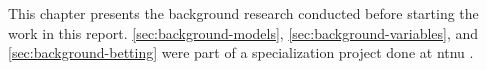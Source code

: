 This chapter presents the background research conducted before starting the work in this report. \cref{sec:background-models}, \cref{sec:background-variables}, and \cref{sec:background-betting} were part of a specialization project done at \gls{ntnu} \citep{bib:boroy-johnsen-2016}.